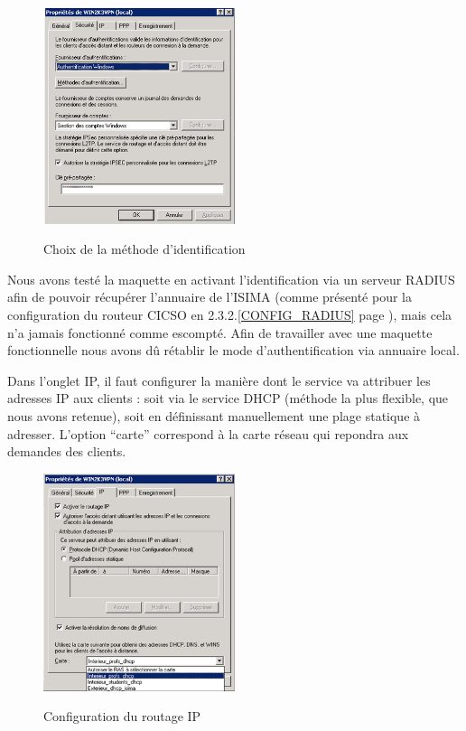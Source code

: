 \begin{figure}[H]
	\begin{center}
		\includegraphics[width=0.50\textwidth]{partie_2/screen_windows/secu_vpn.PNG}\\
	\end{center}
	\caption{Choix de la méthode d'identification}
	\label{VPN_AUTHENTIFICATION}
\end{figure}

Nous avons testé la maquette en activant l'identification via un serveur RADIUS afin de pouvoir récupérer l'annuaire de l'ISIMA (comme présenté pour la configuration du routeur CICSO en 2.3.2.\ref{CONFIG_RADIUS} page \pageref{CONFIG_RADIUS}), mais cela n'a jamais fonctionné comme escompté. Afin de travailler avec une maquette fonctionnelle nous avons dû rétablir le mode d'authentification via annuaire local.

Dans l'onglet IP, il faut configurer la manière dont le service va attribuer les adresses IP aux clients : soit via le service DHCP (méthode la plus flexible, que nous avons retenue), soit en définissant manuellement une plage statique à adresser. L'option ``carte'' correspond à la carte réseau qui repondra aux demandes des clients.

\begin{figure}[H]
	\begin{center}
		\includegraphics[width=0.50\textwidth]{partie_2/screen_windows/choix_carte.PNG}\\
	\end{center}
	\caption{Configuration du routage IP}
	\label{VPN_CARTE_ECOUTE}
\end{figure}

